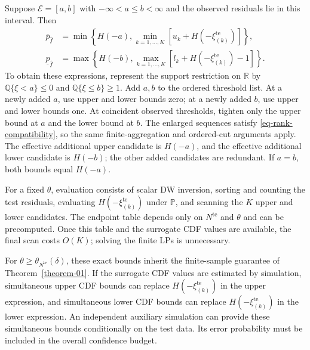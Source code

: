 \documentclass[review,11pt,3p,authoryear,nopreprintline]{elsarticle}
\begin{document}
\begin{remark}
  \label{rem-interval-support}
  Suppose $\mathcal E=[a,b]$ with $-\infty<a\le b<\infty$ and the observed residuals lie in this interval. Then
  \begin{align}
    \overline p_{\hat f}
    &=\min\left\{H(-a),\min_{k=1,\ldots,K}[u_k+H\left(-\xi_{(k)}^{\mathrm{te}}\right)]\right\},
    \label{eq-dw-interval-upper}\\
    \underline p_{\hat f}
    &=\max\left\{H(-b),\max_{k=1,\ldots,K}[l_k+H\left(-\xi_{(k)}^{\mathrm{te}}\right)-1]\right\}.
    \label{eq-dw-interval-lower}
  \end{align}
  To obtain these expressions, represent the support restriction on $\mathbb R$ by
  $\mathbb Q\{\xi<a\}\le0$ and $\mathbb Q\{\xi\le b\}\ge1$.
  Add $a,b$ to the ordered threshold list. At a newly added $a$, use upper and lower bounds zero; at a newly added $b$, use upper and lower bounds one. At coincident observed thresholds, tighten only the upper bound at $a$ and the lower bound at $b$. The enlarged sequences satisfy \eqref{eq-rank-compatibility}, so the same finite-aggregation and ordered-cut arguments apply. The effective additional upper candidate is $H(-a)$, and the effective additional lower candidate is $H(-b)$; the other added candidates are redundant. If $a=b$, both bounds equal $H(-a)$.
\end{remark}

For a fixed $\theta$, evaluation consists of scalar DW inversion, sorting and counting the test residuals, evaluating $H\left(-\xi_{(k)}^{\mathrm{te}}\right)$ under $\mathbb P$, and scanning the $K$ upper and lower candidates. The endpoint table depends only on $N^{\mathrm{te}}$ and $\theta$ and can be precomputed. Once this table and the surrogate CDF values are available, the final scan costs $O(K)$; solving the finite LPs is unnecessary.

For $\theta\ge\theta_{N^{\mathrm{te}}}(\delta)$, these exact bounds inherit the finite-sample guarantee of Theorem~\ref{theorem-01}. If the surrogate CDF values are estimated by simulation, simultaneous upper CDF bounds can replace $H\left(-\xi_{(k)}^{\mathrm{te}}\right)$ in the upper expression, and simultaneous lower CDF bounds can replace $H\left(-\xi_{(k)}^{\mathrm{te}}\right)$ in the lower expression. An independent auxiliary simulation can provide these simultaneous bounds conditionally on the test data. Its error probability must be included in the overall confidence budget.






\end{document}
